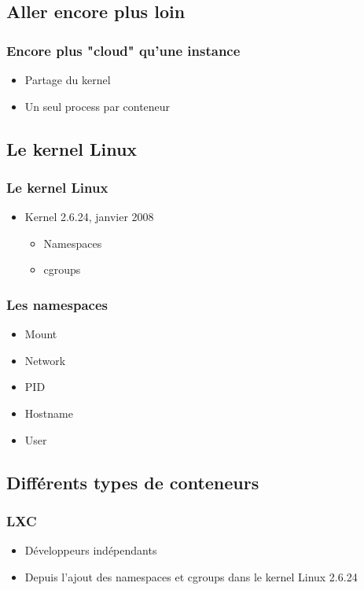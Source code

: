   \subsection[Conteneurs]{Aller encore plus loin}

  \begin{frame}
    \frametitle{Encore plus "cloud" qu'une instance}
    \begin{itemize}
      \item Partage du kernel
      \item Un seul process par conteneur
    \end{itemize}
  \end{frame}

\subsection[Conteneurs]{Le kernel Linux}

  \begin{frame}
    \frametitle{Le kernel Linux}
    \begin{itemize}
      \item Kernel 2.6.24, janvier 2008
      \begin{itemize}
        \item Namespaces
        \item cgroups
      \end{itemize}
    \end{itemize}
  \end{frame}

 \begin{frame}
     \frametitle{Les namespaces}
    \begin{itemize}
      \item Mount
      \item Network
      \item PID
      \item Hostname
      \item User
    \end{itemize}
  \end{frame}

\subsection[Conteneurs]{Différents types de conteneurs}

  \begin{frame}
     \frametitle{LXC}
    \begin{itemize}
      \item Développeurs indépendants
      \item Depuis l'ajout des namespaces et cgroups dans le kernel Linux 2.6.24
    \end{itemize}
  \end{frame}

